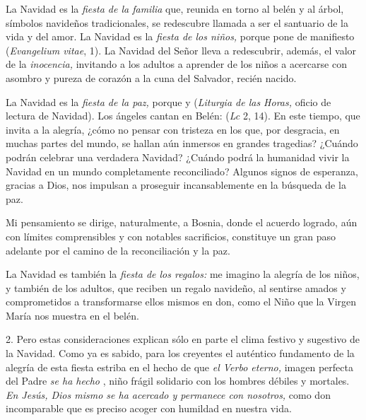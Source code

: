 La Navidad es la \emph{fiesta de la familia} que, reunida en torno al belén y al árbol, símbolos navideños tradicionales, se redescubre llamada a ser el santuario de la vida y del amor. La Navidad es la \emph{fiesta de los niños,} porque pone de manifiesto  (\emph{Evangelium vitae}, 1). La Navidad del Señor lleva a redescubrir, además, el valor de la \emph{inocencia,} invitando a los adultos a aprender de los niños a acercarse con asombro y pureza de corazón a la cuna del Salvador, recién nacido.

La Navidad es la \emph{fiesta de la paz,} porque  y  (\emph{Liturgia de las Horas,} oficio de lectura de Navidad). Los ángeles cantan en Belén:  (\emph{Lc} 2, 14). En este tiempo, que invita a la alegría, ¿cómo no pensar con tristeza en los que, por desgracia, en muchas partes del mundo, se hallan aún inmersos en grandes tragedias? ¿Cuándo podrán celebrar una verdadera Navidad? ¿Cuándo podrá la humanidad vivir la Navidad en un mundo completamente reconciliado? Algunos signos de esperanza, gracias a Dios, nos impulsan a proseguir incansablemente en la búsqueda de la paz.

Mi pensamiento se dirige, naturalmente, a Bosnia, donde el acuerdo logrado, aún con límites comprensibles y con notables sacrificios, constituye un gran paso adelante por el camino de la reconciliación y la paz.

La Navidad es también la \emph{fiesta de los regalos:} me imagino la alegría de los niños, y también de los adultos, que reciben un regalo navideño, al sentirse amados y comprometidos a transformarse ellos mismos en don, como el Niño que la Virgen María nos muestra en el belén.

2. Pero estas consideraciones explican sólo en parte el clima festivo y sugestivo de la Navidad. Como ya es sabido, para los creyentes el auténtico fundamento de la alegría de esta fiesta estriba en el hecho de que \emph{el Verbo eterno,} imagen perfecta del Padre \emph{se ha hecho} , niño frágil solidario con los hombres débiles y mortales. \emph{En Jesús, Dios mismo se ha acercado y permanece con nosotros,} como don incomparable que es preciso acoger con humildad en nuestra vida.

